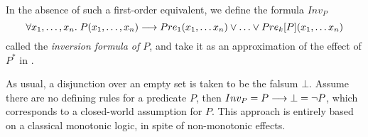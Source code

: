 In the absence of such a first-order equivalent, we define the formula $Inv_P$
\[
\forall x_1, \dots, x_n.\;  P(x_1, \dots, x_n) \IMPL Pre_1(x_1, \dots x_n) \OR \dots \OR Pre_k[P](x_1, \dots x_n)
\]
called the \emph{inversion formula of  $P$}, and take it as an approximation of the
effect of $P^*$ in .

As usual, a disjunction over an empty set is taken to be the falsum
$\bot$. Assume there are no defining rules for a predicate $P$, then $Inv_P =
P \longrightarrow \bot = \lnot P$, which corresponds to a closed-world assumption for
$P$. This approach is entirely
based on a classical monotonic logic, in spite of non-monotonic
effects.







